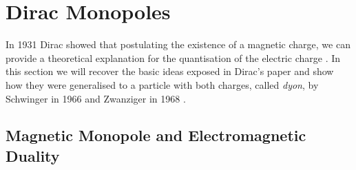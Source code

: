\documentclass[main.tex]{subfiles}
\begin{document}
\section{Dirac Monopoles}\label{sect:Dirac}
In 1931 Dirac showed that postulating the existence of a magnetic charge, we can provide a theoretical explanation for the quantisation of the electric charge \cite{Dirac}. 
In this section we will recover the basic ideas exposed in Dirac's paper and show how they were generalised to a particle with both charges, called \textit{dyon}, by Schwinger in 1966 \cite{S:dyon} and Zwanziger in 1968 \cite{Z:dyon}.


\subsection{Magnetic Monopole and Electromagnetic Duality}
\end{document}

